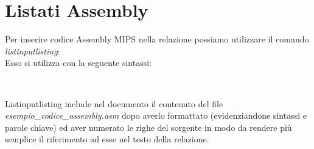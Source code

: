 \documentclass[11pt]{article}
\begin{document}
\section{Listati Assembly}
Per inserire codice Assembly MIPS nella relazione possiamo utilizzare il comando \textit{listinputlisting}:\\
 
Esso si utilizza con la seguente sintassi:
\begin{verbatim} 
  
\end{verbatim} 
Listinputlisting include nel documento il contenuto del file \textit{esempio\_codice\_assembly.asm} dopo averlo formattato (evidenziandone sintassi e parole chiave) ed aver numerato le righe del sorgente in modo da rendere pi\`u semplice il riferimento ad esse nel testo della relazione.
\end{document}
